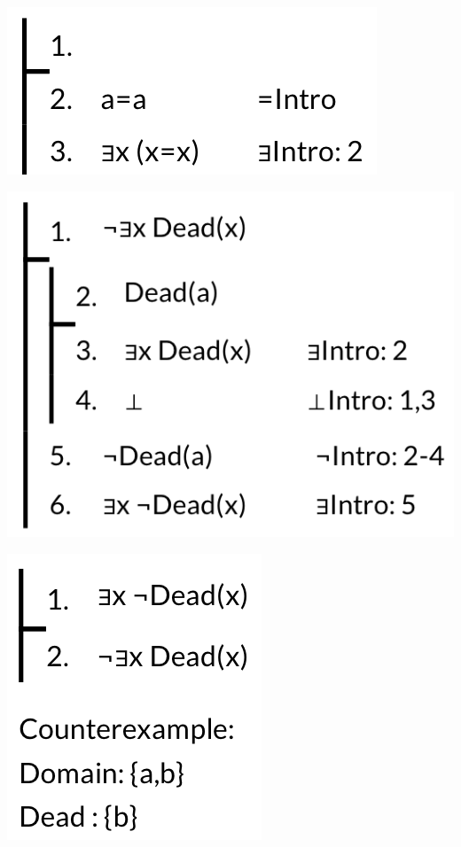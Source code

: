\documentclass[12pt]{extarticle}
\begin{document}
\begin{multicols*}{3}
\begin{center}
\includegraphics[scale=0.3]{img/unit_605_prf1.png}
\end{center}
\begin{center}
\includegraphics[scale=0.3]{img/unit_605_prf2.png}
\end{center}
\begin{center}
\includegraphics[scale=0.3]{img/unit_605_counterexample.png}
\end{center} 
 

\end{multicols*}
\end{document}
